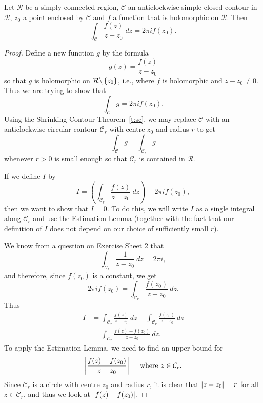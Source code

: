 



\begin{theorem}
\label{t:cauchyformula}
Let $\mathcal{R}$ be a simply connected region, $\mathcal{C}$ an anticlockwise simple closed contour in $\mathcal{R}$, $z_0$ a point enclosed by $\mathcal{C}$ and $f$ a function that is holomorphic on $\mathcal{R}$.  Then
\[
\int_{\mathcal{C}} \frac{f(z)}{z-z_0} \ dz = 2 \pi i f( z_0).
\]
\end{theorem}
\begin{proof}
Define a new function $g$ by the formula
\[
g(z) = \frac{f(z)}{z-z_0}
\]
so that $g$ is holomorphic on $\mathcal{R} \backslash \left\{z_0\right\}$, i.e., where $f$ is holomorphic and $z-z_0 \neq 0$.  Thus we are trying to show that
\[
\int_{\mathcal{C}} g = 2\pi i f(z_0).
\]
Using the Shrinking Contour Theorem~\ref{t:sc}, we may replace $\mathcal{C}$ with an anticlockwise circular contour $\mathcal{C}_r$ with centre $z_0$ and radius $r$ to get
\[
\int_{\mathcal{C}} g = \int_{\mathcal{C}_r} g
\]
whenever $r>0$ is small enough so that $\mathcal{C}_r$ is contained in $\mathcal{R}$.  

If we define $I$ by
\[
I = \left(\int_{\mathcal{C}_r} \frac{f(z)}{z-z_0}\ dz \right) - 2 \pi i f(z_0),
\]
then we want to show that $I=0$.  To do this, we will write $I$ as a single integral along $\mathcal{C}_r$ and use the Estimation Lemma (together with the fact that our definition of $I$ does not depend on our choice of sufficiently small $r$).

We know from a question on Exercise Sheet 2 that
\[
\int_{\mathcal{C}_r} \frac{1}{z-z_0}\ dz = 2\pi i,
\]
and therefore, since $f(z_0)$ is a constant, we get
\[
2\pi i f(z_0) = \int_{\mathcal{C}_r} \frac{f(z_0)}{z-z_0}\ dz.
\]
Thus
\begin{align*}
I &= \int_{\mathcal{C}_r} \frac{f(z)}{z-z_0}\ dz - \int_{\mathcal{C}_r} \frac{f(z_0)}{z-z_0}\ dz \\
& = \int_{\mathcal{C}_r} \frac{f(z)-f(z_0)}{z-z_0}\ dz.
\end{align*}
To apply the Estimation Lemma, we need to find an upper bound for
\[
\left|  \frac{f(z)-f(z_0)}{z-z_0}  \right| \quad \text{ where } z \in \mathcal{C}_r.
\]
Since $\mathcal{C}_r$ is a circle with centre $z_0$ and radius $r$, it is clear that $\left| z-z_0 \right| = r$ for all $z \in \mathcal{C}_r$, and thus we look at $\left| f(z)-f(z_0) \right|$.


\end{proof}
